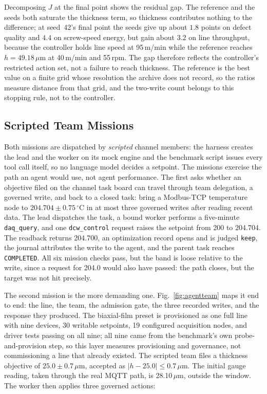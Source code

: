 Decomposing $J$ at the final point shows the residual gap. The reference and the
seeds both saturate the thickness term, so thickness contributes nothing to the
difference; at seed~42's final point the seeds give up about $1.8$ points on defect quality and $4.4$ on screw-speed energy, but gain about $3.2$ on line throughput, because the controller
holds line speed at 95\,m/min while the reference reaches $h=49.18\,\mu$m at
40\,m/min and 55\,rpm. The gap therefore reflects the controller's restricted action set, not a failure to reach thickness. The reference is the best value on a finite grid
whose resolution the archive does not record, so the ratios measure distance from
that grid, and the two-write count belongs to this stopping rule, not to the
controller.

\subsection{Scripted Team Missions}
\label{sec:agentloop}
Both missions are dispatched by \emph{scripted} channel members: the harness creates
the lead and the worker on its mock engine and the benchmark script issues every
tool call itself, so no language model decides a setpoint. The missions exercise the
path an agent would use, not agent performance. The first asks whether an objective
filed on the channel task board can travel through team delegation, a governed
write, and back to a closed task: bring a Modbus-TCP temperature node to
$204.704\pm0.75\,^\circ$C in at most three governed writes after reading recent
data. The lead dispatches the task, a bound worker performs a five-minute
\texttt{daq\_query}, and one \texttt{dcw\_control} request raises the setpoint from
200 to 204.704. The readback returns 204.700, an optimization record opens and is
judged \texttt{keep}, the journal attributes the write to the agent, and the parent
task reaches \texttt{COMPLETED}. All six mission checks pass, but the band is loose
relative to the write, since a request for 204.0 would also have passed: the path
closes, but the target was not hit precisely.

The second mission is the more demanding one. Fig.~\ref{fig:agentteam} maps it end
to end: the line, the team, the admission gate, the three recorded writes, and the
response they produced. The biaxial-film preset is provisioned as one full line with nine
devices, 30 writable setpoints, 19 configured acquisition nodes, and driver tests
passing on all nine; all nine came from the benchmark's own probe-and-provision
step, so this layer measures provisioning and governance, not commissioning a line
that already existed. The scripted team files a thickness objective of
$25.0\pm0.7\,\mu$m, accepted as $|h-25.0|\leq0.7\,\mu$m. The initial gauge reading,
taken through the real MQTT path, is 28.10\,$\mu$m, outside the window. The worker
then applies three governed actions:

